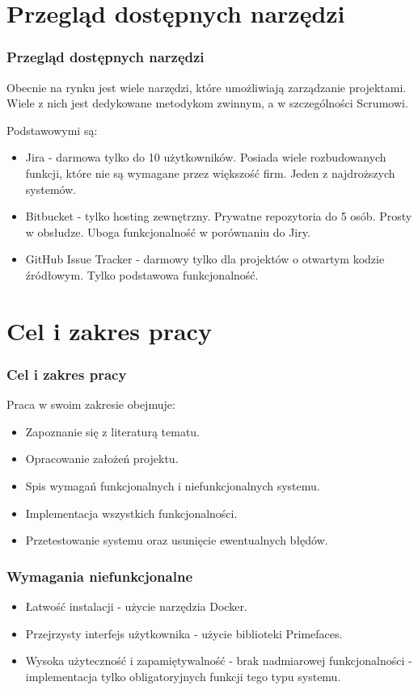 \documentclass[hyperref={pdfpagelabels=false}]{beamer}
\begin{document}
\section[Przegląd narzędzi]{Przegląd dostępnych narzędzi}
\begin{frame}
	\frametitle{Przegląd dostępnych narzędzi}
	Obecnie na rynku jest wiele narzędzi, które umożliwiają zarządzanie projektami. Wiele z nich jest dedykowane metodykom zwinnym, a w szczególności Scrumowi.
	
	Podstawowymi są:
	\begin{itemize}
		\item Jira - darmowa tylko do 10 użytkowników. Posiada wiele rozbudowanych funkcji, które nie są wymagane przez większość firm. Jeden z najdroższych systemów.
		\item Bitbucket - tylko hosting zewnętrzny. Prywatne repozytoria do 5 osób. Prosty w obsłudze. Uboga funkcjonalność w porównaniu do Jiry.
		\item GitHub Issue Tracker - darmowy tylko dla projektów o otwartym kodzie źródłowym. Tylko podstawowa funkcjonalność.
	\end{itemize}
\end{frame}

\section[Cel pracy]{Cel i zakres pracy}
\begin{frame}
	\frametitle{Cel i zakres pracy}
		Praca w swoim zakresie obejmuje:
		\begin{itemize}			
			\item Zapoznanie się z literaturą tematu.
			\item Opracowanie założeń projektu.
			\item Spis wymagań funkcjonalnych i niefunkcjonalnych systemu.
			\item Implementacja wszystkich funkcjonalności.
			\item Przetestowanie systemu oraz usunięcie ewentualnych błędów.
		\end{itemize}
\end{frame}
\begin{frame}
	\frametitle{Wymagania niefunkcjonalne}
		\begin{itemize}
			\item Łatwość instalacji - użycie narzędzia Docker.
			\item Przejrzysty interfejs użytkownika - użycie biblioteki Primefaces.
			\item Wysoka użyteczność i zapamiętywalność - brak nadmiarowej funkcjonalności - implementacja tylko
			obligatoryjnych funkcji tego typu systemu.
		\end{itemize}
\end{frame}
\end{document}

